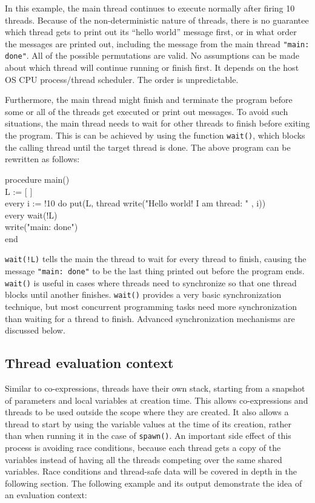 In this example, the main thread continues to execute normally after
firing 10 threads. Because of the non-deterministic nature of threads,
there is no guarantee which thread gets to print out its ``hello
world'' message first, or in what order the messages are printed out,
including the message from the main thread \texttt{"main: done"}.  All
of the possible permutations are valid. No assumptions can be made
about which thread will continue running or finish first.  It depends
on the host OS CPU process/thread scheduler. The order is
unpredictable.

Furthermore, the main thread might finish and terminate the program
before some or all of the threads get executed or print out messages.
To avoid such situations, the main thread needs to wait for other
threads to finish before exiting the program. This is can be achieved
by using the function \texttt{wait()}, which blocks the calling thread
until the target thread is done. The above program can be rewritten as
follows:

\begin{icode}
procedure main() \\
\> L := [ ] \\
\> every i := !10 do put(L, thread write("Hello world! I am thread: " , i)) \\
\> every wait(!L) \\
\> write("main: done") \\
end
\end{icode}

\noindent
\texttt{wait(!L)} tells the main the thread to wait for every thread
to finish, causing the message \texttt{"main: done"} to be the last
thing printed out before the program ends. \texttt{wait()} is useful
in cases where threads need to synchronize so that one thread blocks
until another finishes. \texttt{wait()} provides a very basic
synchronization technique, but most concurrent programming tasks need
more synchronization than waiting for a thread to finish.  Advanced
synchronization mechanisms are discussed below.


\subsection*{Thread evaluation context}

Similar to co-expressions, threads have their own stack, starting from
a snapshot of parameters and local variables at creation time. This
allows co-expressions and threads to be used outside the scope where
they are created. It also allows a thread to start by using the
variable values at the time of its creation, rather than when running
it in the case of \texttt{spawn()}.  An important side effect of this
process is avoiding race conditions, because each thread gets a copy
of the variables instead of having all the threads competing over the
same shared variables. Race conditions and thread-safe data will be
covered in depth in the following section. The following example and
its output demonstrate the idea of an evaluation context:

